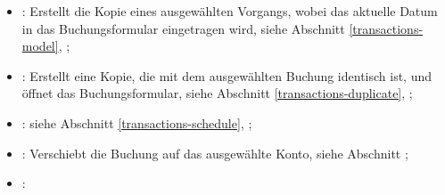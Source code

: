 \begin{itemize}
	\item {}: Erstellt die Kopie eines ausgewählten Vorgangs, wobei das aktuelle Datum in das Buchungsformular eingetragen wird, siehe Abschnitt \vref{transactions-model}, ;%
	\item {}: Erstellt eine Kopie, die mit dem ausgewählten Buchung identisch ist, und öffnet das Buchungsformular, siehe Abschnitt \vref{transactions-duplicate}, ;%
	\item {}: siehe Abschnitt \vref{transactions-schedule}, ;%
	\item {}: Verschiebt die Buchung auf das ausgewählte Konto, siehe Abschnitt ;%
	\item {}:
	\begin{itemize}

\end{itemize}
\end{itemize}
